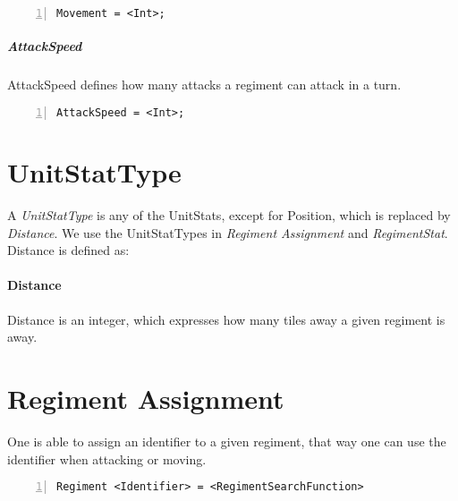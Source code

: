 		\begin{lstlisting}[basicstyle=\small\sffamily,
		keywordstyle={\color{blue}},
		comment={[l]{//}}, morecomment={[s]{/*}{*/}}, commentstyle=\itshape,
		columns={[l]flexible}, numbers=left, numberstyle=\tiny,
		frameround=fftt, frame=shadowbox, captionpos=b,
		caption={Regiment Assignment},
		label=RegimentAssignment]
				Movement = <Int>;
			\end{lstlisting}
		\subparagraph{AttackSpeed}
			AttackSpeed defines how many attacks a regiment can attack in a turn.

		\begin{lstlisting}[basicstyle=\small\sffamily,
		keywordstyle={\color{blue}},
		comment={[l]{//}}, morecomment={[s]{/*}{*/}}, commentstyle=\itshape,
		columns={[l]flexible}, numbers=left, numberstyle=\tiny,
		frameround=fftt, frame=shadowbox, captionpos=b,
		caption={Regiment Assignment},
		label=RegimentAssignment]
				AttackSpeed = <Int>;
			\end{lstlisting}

\section{UnitStatType}
	A {\it UnitStatType} is any of the UnitStats, except for Position, which is replaced by {\it Distance}. We use the UnitStatTypes in 
	{\it Regiment Assignment} and {\it RegimentStat}.
	Distance is defined as:
	\paragraph{Distance}
		Distance is an integer, which expresses how many tiles away a given regiment is away.

\section{Regiment Assignment}
\label{doc:regass}
	One is able to assign an identifier to a given regiment, that way one can use the identifier when attacking or moving.
	
		\begin{lstlisting}[basicstyle=\small\sffamily,
		keywordstyle={\color{blue}},
		comment={[l]{//}}, morecomment={[s]{/*}{*/}}, commentstyle=\itshape,
		columns={[l]flexible}, numbers=left, numberstyle=\tiny,
		frameround=fftt, frame=shadowbox, captionpos=b,
		caption={Regiment Assignment},
		label=RegimentAssignment]
Regiment <Identifier> = <RegimentSearchFunction>			
		\end{lstlisting}	

